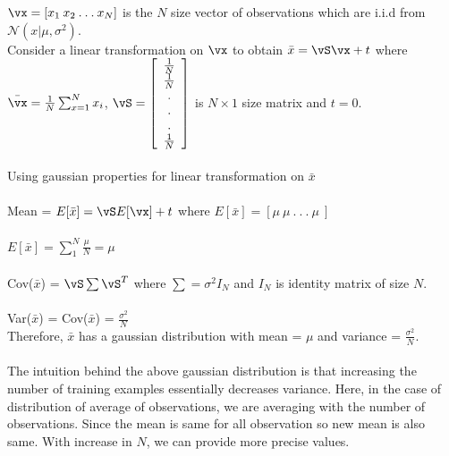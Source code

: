 \documentclass[a4paper,11pt]{article}
\begin{document}
\begin{pmisolution}
$\vx = [x_{1} \: x_{2}\: .\: . \: . \: x_{N}]$ is the $N$ size vector of observations which are i.i.d from \(\mathcal{N}(x|\mu,\sigma^{2})\). \\
Consider a linear transformation on $\vx$ to obtain \(\bar{x} = \vS\vx + t\) where \(\bar{\vx} = \frac{1}{N}\sum_{x=1}^{N} x_{i}\), \(\vS =
\left[ {\begin{array}{c}
  \frac{1}{N} \\
  \frac{1}{N} \\
  . \\
  . \\
  . \\
  \frac{1}{N}\\
  \end{array} } \right]\)
is \(N \times 1\) size matrix and \(t=0\). \\
\\
Using gaussian properties for linear transformation on \(\bar{x}\)\\\\
Mean  = \(E[\bar{x}] = \vS E[\vx] + t\) \hfill where \(E[\bar{x}] = [\mu\: \mu\: .\:.\: . \: \mu\: ]\)\\
\\
\(E[\bar{x}] = \sum_{1}^{N} \frac{\mu}{N} = \mu \)\\
\\
Cov(\(\bar{x}\)) = \(\vS \sum \vS^{T}\) \hfill where \(\sum = \sigma^{2} I_{N}\) and \(I_{N}\) is identity matrix of size \(N\).\\
\\
Var(\(\bar{x}\)) = Cov(\(\bar{x}\)) = \(\frac{\sigma^{2}}{N}\)\\
Therefore, \(\bar{x}\) has a gaussian distribution with mean = \(\mu\) and variance = \(\frac{\sigma^{2}}{N}\). \\
\\
The intuition behind the above gaussian distribution is that increasing the number of training examples essentially decreases variance. Here, in the case of distribution of average of observations, we are averaging with the number of observations. Since the mean is same for all observation so new mean is also same. With increase in \(N\), we can provide more precise values.
\end{pmisolution}
\end{document}
